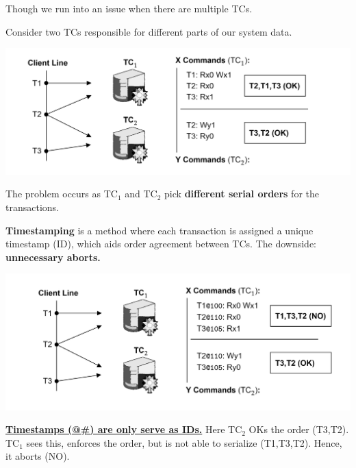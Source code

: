     \newpage

    \noindent
    Though we run into an issue when there are multiple TCs.
    \begin{Example}

        Consider two TCs responsible for different parts of our system data.

        \noindent
        \includegraphics[width=\textwidth]{Sections/trans/central_3.png}

        \noindent
        The problem occurs as TC$_1$ and TC$_2$ pick \textbf{different serial orders} for the transactions.
    \end{Example}
    
\begin{theo}

    \textbf{Timestamping} is a method where each transaction is assigned a unique timestamp (ID), which aids
    order agreement between TCs. The downside: \textbf{unnecessary aborts.}
\end{theo}

\begin{Example}

    \vspace{-1em}
    \noindent
    \includegraphics[width=\textwidth]{Sections/trans/central_4.png}

    \noindent
    \underline{\textbf{Timestamps (@\#) are only serve as IDs.}} Here TC$_2$ OKs the order (T3,T2). TC$_1$ sees this,
    enforces the order, but is not able to serialize (T1,T3,T2). Hence, it aborts (NO).
    \end{Example}

